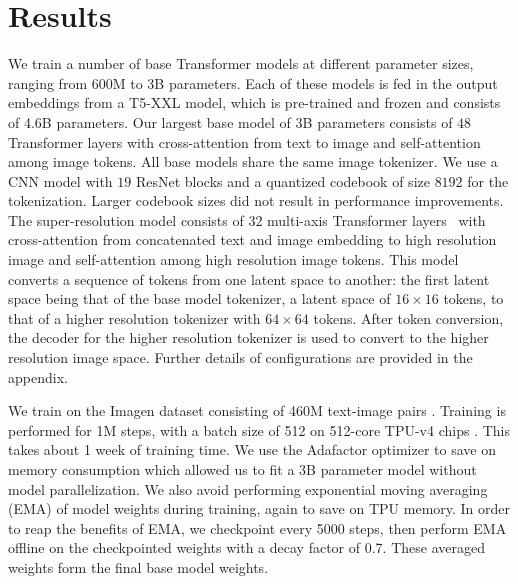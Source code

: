 \section{Results}
\label{sec:results}
We train a number of base Transformer models at different parameter sizes, ranging from 600M to 3B parameters. Each of these models is fed in the output embeddings from a T5-XXL model, which is pre-trained and frozen and consists of 4.6B parameters. Our largest base model of 3B parameters consists of $48$ Transformer layers with cross-attention from text to image and self-attention among image tokens. All base models share the same image tokenizer. We use a CNN model with $19$ ResNet blocks and a quantized codebook of size $8192$ for the tokenization. Larger codebook sizes did not result in performance improvements. The super-resolution model consists of $32$ multi-axis Transformer layers~\cite{hit} with cross-attention from concatenated text and image embedding to high resolution image and self-attention among high resolution image tokens. This model converts a sequence of tokens from one latent space to another: the first latent space being that of the base model tokenizer, a latent space of $16\times16$ tokens, to that of a higher resolution tokenizer with $64\times64$ tokens. After token conversion, the decoder for the higher resolution tokenizer is used to convert to the higher resolution image space. Further details of configurations are provided in the appendix.

We train on the Imagen dataset consisting of 460M text-image pairs \citep{imagen}.
Training is performed for 1M steps, with a batch size of 512 on 512-core TPU-v4 chips \citep{jouppi2020domain}. This takes about 1 week of training time. We use the Adafactor optimizer \citep{shazeer2018adafactor} to save on memory consumption which allowed us to fit a 3B parameter model without model parallelization. We also avoid performing exponential moving averaging (EMA) of model weights during training, again to save on TPU memory. In order to reap the benefits of EMA, we checkpoint every 5000 steps, then perform EMA offline on the checkpointed weights with a decay factor of 0.7. These averaged weights form the final base model weights.

